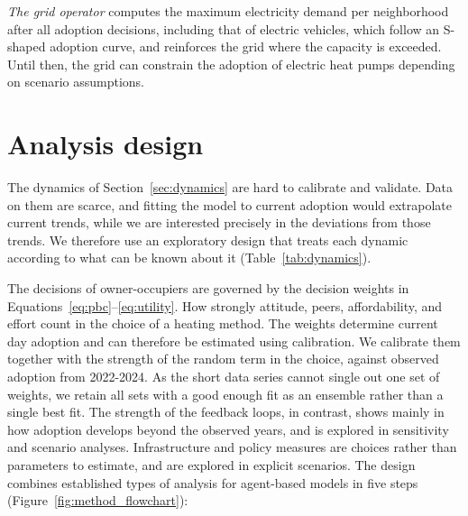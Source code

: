 \documentclass[preprint,12pt,authoryear]{elsarticle}
\begin{document}
\emph{The grid operator} computes the maximum electricity demand per
neighborhood after all adoption decisions, including that of electric
vehicles, which follow an S-shaped adoption curve, and reinforces the grid
where the capacity is exceeded. Until then, the grid can constrain the
adoption of electric heat pumps depending on scenario assumptions.

\section{Analysis design}
\label{sec:design}
The dynamics of Section~\ref{sec:dynamics} are hard to calibrate and
validate. Data on them are scarce, and fitting the model to current adoption
would extrapolate current trends, while we are interested precisely in the
deviations from those trends. We therefore use an exploratory design that
treats each dynamic according to what can be known about it
(Table~\ref{tab:dynamics}).

The decisions of owner-occupiers are governed by the decision weights in
Equations~\ref{eq:pbc}--\ref{eq:utility}. How strongly attitude, peers,
affordability, and effort count in the choice of a heating method. 
The weights determine current day adoption and can therefore be 
estimated using calibration. We calibrate them together with the
strength of the random term in the choice, against observed adoption from 2022-2024.
As the short data series cannot single out one set of weights, we retain all sets
with a good enough fit as an ensemble rather than a single best fit. The strength
of the feedback loops, in contrast, shows mainly in how adoption develops
beyond the observed years, and is explored in sensitivity and scenario
analyses. Infrastructure and policy measures are choices rather than parameters to
estimate, and are explored in explicit scenarios. The design combines
established types of analysis for agent-based models
\citep{leeComplexitiesAgentBasedModeling2015} in five steps
(Figure~\ref{fig:method_flowchart}):
\end{document}
